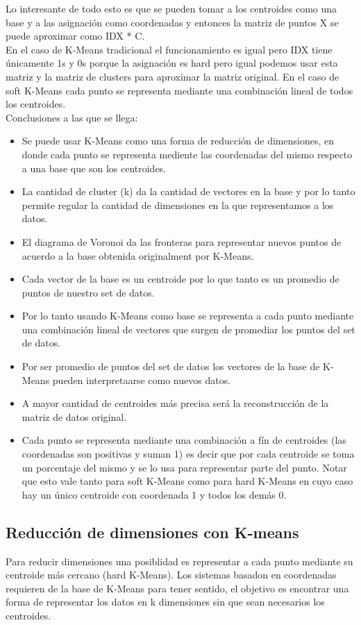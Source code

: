 \documentclass[titlepage,a4paper]{article}
\begin{document}
Lo interesante de todo esto es que se pueden tomar a los centroides como una base y a las asignación como coordenadas y entonces la matriz de puntos X se puede aproximar como IDX * C. \\

En el caso de K-Means tradicional el funcionamiento es igual pero IDX tiene únicamente 1s y 0s porque la asignación es hard pero igual podemos usar esta matriz y la matriz de clusters para aproximar la matriz original. En el caso de soft K-Means cada punto se representa mediante una combinación lineal de todos los centroides. \\

Conclusiones a las que se llega: 
\begin{itemize}
\item Se puede usar K-Means como una forma de reducción de dimensiones, en donde cada punto se representa mediente las coordenadas del mismo respecto a una base que son los centroides. 
\item La cantidad de cluster (k) da la cantidad de vectores en la base y por lo tanto permite regular la cantidad de dimensiones en la que representamos a los datos. 
\item El diagrama de Voronoi da las fronteras para representar nuevos puntos de acuerdo a la base obtenida originalment por K-Means. 
\item Cada vector de la base es un centroide por lo que tanto es un promedio de puntos de nuestro set de datos. 
\item Por lo tanto usando K-Means como base se representa a cada punto mediante una combinación lineal de vectores que surgen de promediar los puntos del set de datos. 
\item Por ser promedio de puntos del set de datos los vectores de la base de K-Means  pueden interpretaarse como nuevos datos. 
\item A mayor cantidad de centroides más precisa será la reconstrucción de la matriz de datos original. 
\item Cada punto se representa mediante una combinación a fín de centroides (las coordenadas son positivas y suman 1) es decir que por cada centroide se toma un porcentaje del mismo y se lo usa para representar parte del punto. Notar que esto vale tanto para soft K-Means como para hard K-Means  en cuyo caso hay un único centroide con coordenada 1 y todos los demás 0.  
\end{itemize}

\subsection*{Reducción de dimensiones con K-means}
Para reducir dimensiones una posiblidad es representar a cada punto mediante su centroide más cercano (hard K-Means). Los sistemas basadon en coordenadas requieren de la base de K-Means para tener sentido, el objetivo es encontrar una forma de representar los datos en k dimensiones sin que sean necesarios los centroides. \\
\end{document}
